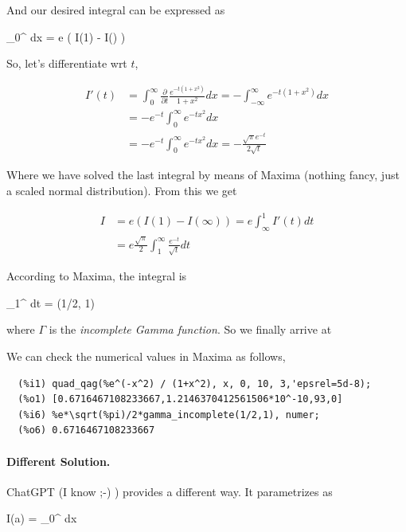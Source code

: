 And our desired integral can be expressed as

\bee
\int_{0}^\infty {} dx = e \left( I(1) - I(\infty) \right)
\eee

So, let's differentiate wrt $t$,

\begin{align*}
  I'(t) &= \int_{0}^\infty \frac{\partial }{\partial t}\frac{e^{-t(1 + x^2)}}{1 + x^2} dx = - \int_{- \infty}^\infty e^{-t(1 + x^2)} dx \\
  &= - e^{-t} \int_{0}^\infty e^{-t x^2} dx \\
  &= - e^{-t} \int_{0}^\infty e^{-t x^2} dx = - \frac{\sqrt{\pi} e^{-t}}{2 \sqrt{t}}
\end{align*}

Where we have solved the last integral by means of Maxima (nothing fancy, just a scaled normal distribution). From this we get

\begin{align*}
I &= e \left( I(1) - I(\infty) \right) = e \int_\infty^1 I'(t) dt \\
&= e \frac{\sqrt{\pi}}{2} \int_1^\infty \frac{e^{-t}}{\sqrt{t}} dt
\end{align*}

According to Maxima, the integral is

\bee
\int_1^\infty {} dt = \Gamma(1/2, 1)
\eee

where $\Gamma$ is the \emph{incomplete Gamma function}. So we finally arrive at

\bee
{}
\eee

We can check the numerical values in Maxima as follows,

\begin{verbatim}
  (%i1)	quad_qag(%e^(-x^2) / (1+x^2), x, 0, 10, 3,'epsrel=5d-8);
  (%o1)	[0.6716467108233667,1.2146370412561506*10^-10,93,0]
  (%i6)	%e*\sqrt(%pi)/2*gamma_incomplete(1/2,1), numer;
  (%o6)	0.6716467108233667
\end{verbatim}


\paragraph{Different Solution.} ChatGPT (I know ;-) ) provides a different way. It parametrizes as

\bee
I(a) = \int_0^\infty {} dx
\eee

